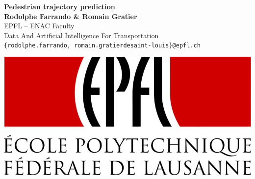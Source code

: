 \documentclass[a0,portrait]{a0poster}
\begin{document}


\begin{minipage}[b]{0.75\linewidth}
\veryHuge \color{NavyBlue} \textbf{Pedestrian trajectory prediction} \color{Black}\\ %
\huge \textbf{Rodolphe Farrando \& Romain Gratier}\\[0.5cm] %
\huge EPFL -- ENAC Faculty\\[0.4cm] %
\LARGE Data And Artificial Intelligence For Transportation\\[0.4cm]
\Large \texttt{\{rodolphe.farrando, romain.gratierdesaint-louis\}@epfl.ch}\\
\end{minipage}
%
\begin{minipage}[b]{0.25\linewidth}
\includegraphics[width=20cm]{./figure/epfl_logo.jpg}\\
\end{minipage}

\vspace{1cm} %

\end{document}
